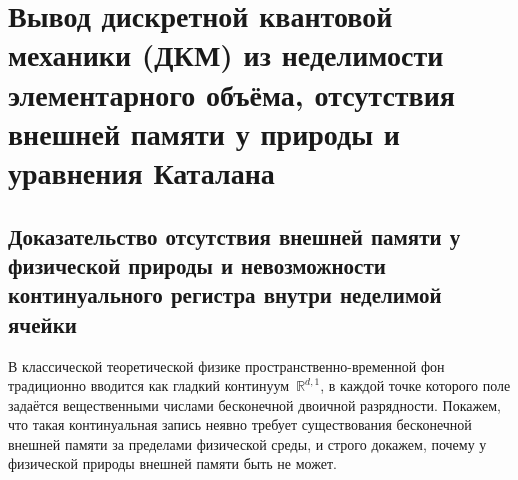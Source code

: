\chapter{Вывод дискретной квантовой механики (ДКМ) из неделимости элементарного объёма, отсутствия внешней памяти у природы и уравнения Каталана}
\label{ch:mono-axioms}

\section{Доказательство отсутствия внешней памяти у физической природы и невозможности континуального регистра внутри неделимой ячейки}

В классической теоретической физике пространственно-временной фон традиционно вводится как гладкий континуум~$\mathbb{R}^{d,1}$, в каждой точке которого поле задаётся вещественными числами бесконечной двоичной разрядности. Покажем, что такая континуальная запись неявно требует существования бесконечной внешней памяти за пределами физической среды, и строго докажем, почему у физической природы внешней памяти быть не может.

